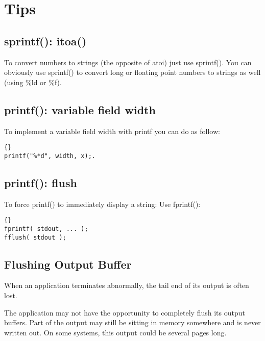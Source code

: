 \documentclass{report}
\begin{document}
\chapter{Tips}



\section{sprintf(): itoa()}
To convert numbers to strings (the opposite of atoi) just use sprintf().
You can obviously use sprintf() to convert long or floating point numbers to strings as well (using \%ld or \%f).
	
\section{printf(): variable field width}
To implement a variable field width with printf you can do as follow:
\begin{lstlisting}{}
printf("%*d", width, x);.
\end{lstlisting}

\section{printf(): flush}
To force printf() to immediately display a string:
Use fprintf():
\begin{lstlisting}{}
fprintf( stdout, ... );
fflush( stdout );
\end{lstlisting}

\section{Flushing Output Buffer} 
When an application terminates abnormally, the tail end of its output is often lost.

The application may not have the opportunity to completely flush its output buffers. Part of the output may still be sitting in memory somewhere and is never written out. On some systems, this output could be several pages long.
\end{document}
